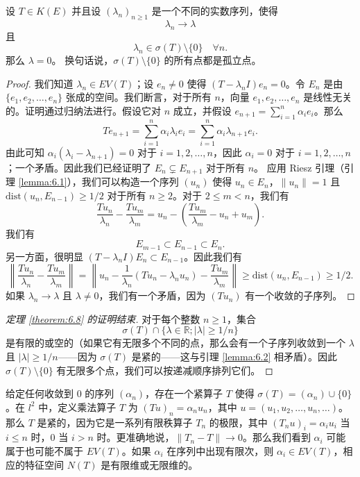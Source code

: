 \begin{lemma}\label{lemma:6.2}
设 \(T \in K(E)\) 并且设 \((\lambda_n)_{n \ge 1}\) 是一个不同的实数序列，使得
\[
\lambda_n \to \lambda
\]
且
\[
\lambda_n \in \sigma(T) \setminus \{0\} \quad \forall n.
\]
那么 \(\lambda = 0\)。
换句话说，\(\sigma(T)\setminus\{0\}\) 的所有点都是孤立点。
\end{lemma}

\begin{proof}
我们知道 \(\lambda_n \in EV(T)\)；设 \(e_n \ne 0\) 使得 \((T - \lambda_n I)e_n = 0\)。令 \(E_n\) 是由 \(\{e_1, e_2, \ldots, e_n\}\) 张成的空间。我们断言，对于所有 \(n\)，向量 \(e_1, e_2, \ldots, e_n\) 是线性无关的。证明通过归纳法进行。假设它对 \(n\) 成立，并假设 \(e_{n+1} = \sum_{i=1}^n \alpha_i e_i\)。那么
\[
Te_{n+1} = \sum_{i=1}^n \alpha_i \lambda_i e_i = \sum_{i=1}^n \alpha_i \lambda_{n+1} e_i.
\]
由此可知 \(\alpha_i(\lambda_i - \lambda_{n+1}) = 0\) 对于 \(i=1, 2, \ldots, n\)，因此 \(\alpha_i=0\) 对于 \(i=1, 2, \ldots, n\)；一个矛盾。因此我们已经证明了 \(E_n \subsetneq E_{n+1}\) 对于所有 \(n\)。
应用 Riesz 引理（引理 \ref{lemma:6.1}），我们可以构造一个序列 \((u_n)\) 使得 \(u_n \in E_n\)，\(\|u_n\|=1\) 且 \(\mathrm{dist}(u_n, E_{n-1}) \ge 1/2\) 对于所有 \(n \ge 2\)。对于 \(2 \le m < n\)，我们有
\[
\frac{Tu_n}{\lambda_n} - \frac{Tu_m}{\lambda_m} = u_n - \left( \frac{Tu_m}{\lambda_m} - u_n + u_m \right).
\]
我们有
\[
E_{m-1} \subset E_{n-1} \subset E_n.
\]
另一方面，很明显 \((T - \lambda_n I)E_n \subset E_{n-1}\)。因此我们有
\[
\left\| \frac{Tu_n}{\lambda_n} - \frac{Tu_m}{\lambda_m} \right\| = \left\| u_n - \frac{1}{\lambda_n}(Tu_n - \lambda_n u_n) - \frac{Tu_m}{\lambda_m} \right\| \ge \mathrm{dist}(u_n, E_{n-1}) \ge 1/2.
\]
如果 \(\lambda_n \to \lambda\) 且 \(\lambda \ne 0\)，我们有一个矛盾，因为 \((Tu_n)\) 有一个收敛的子序列。
\end{proof}

\begin{proof}[定理 \ref{theorem:6.8} 的证明结束]
对于每个整数 \(n \ge 1\)，集合
\[
\sigma(T) \cap \{\lambda \in \mathbb{R}; |\lambda| \ge 1/n\}
\]
是有限的或空的（如果它有无限多个不同的点，那么会有一个子序列收敛到一个 \(\lambda\) 且 \(|\lambda| \ge 1/n\)——因为 \(\sigma(T)\) 是紧的——这与引理 \ref{lemma:6.2} 相矛盾）。因此 \(\sigma(T) \setminus \{0\}\) 有无限多个点，我们可以按递减顺序排列它们。
\end{proof}

\begin{remark}\label{remark:6.7}
给定任何收敛到 0 的序列 \((\alpha_n)\)，存在一个紧算子 \(T\) 使得 \(\sigma(T) = (\alpha_n) \cup \{0\}\)。在 \(l^2\) 中，定义乘法算子 \(T\) 为 \((Tu)_n = \alpha_n u_n\)，其中 \(u = (u_1, u_2, \ldots, u_n, \ldots)\)。那么 \(T\) 是紧的，因为它是一系列有限秩算子 \(T_n\) 的极限，其中 \((T_n u)_i = \alpha_i u_i\) 当 \(i \le n\) 时，\(0\) 当 \(i > n\) 时。更准确地说，\(\|T_n-T\| \to 0\)。那么我们看到 \(\alpha_i\) 可能属于也可能不属于 \(EV(T)\)。如果 \(\alpha_i\) 在序列中出现有限次，则 \(\alpha_i \in EV(T)\)，相应的特征空间 \(N(T)\) 是有限维或无限维的。
\end{remark}

